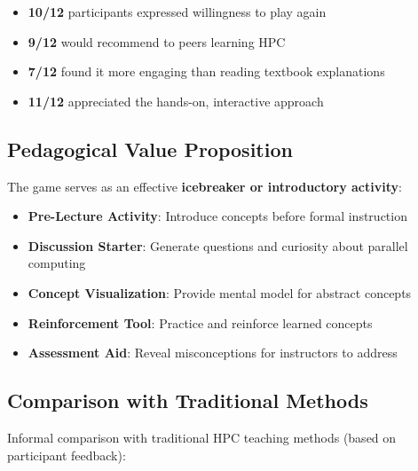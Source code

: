 \begin{itemize}
    \item \textbf{10/12} participants expressed willingness to play again
    \item \textbf{9/12} would recommend to peers learning HPC
    \item \textbf{7/12} found it more engaging than reading textbook explanations
    \item \textbf{11/12} appreciated the hands-on, interactive approach
\end{itemize}

\subsection{Pedagogical Value Proposition}
\label{subsec:pedagogical-value}

The game serves as an effective \textbf{icebreaker or introductory activity}:

\begin{itemize}
    \item \textbf{Pre-Lecture Activity}: Introduce concepts before formal instruction
    \item \textbf{Discussion Starter}: Generate questions and curiosity about parallel computing
    \item \textbf{Concept Visualization}: Provide mental model for abstract concepts
    \item \textbf{Reinforcement Tool}: Practice and reinforce learned concepts
    \item \textbf{Assessment Aid}: Reveal misconceptions for instructors to address
\end{itemize}

\subsection{Comparison with Traditional Methods}
\label{subsec:comparison-traditional}

Informal comparison with traditional HPC teaching methods (based on participant feedback):

